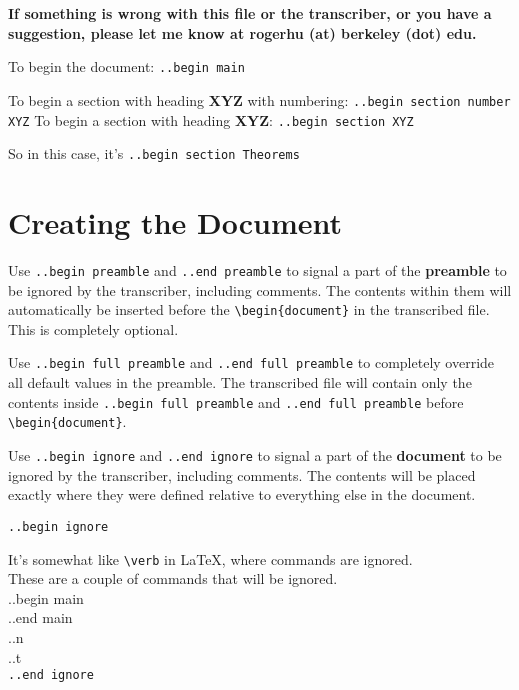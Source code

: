 \documentclass[12pt]{article}
\begin{document}
\begin{flushleft}

\textbf{If something is wrong with this file or the transcriber, or you have a suggestion, please let me know at rogerhu (at) berkeley (dot) edu.}

\bigskip

To begin the document: \verb|..begin main|

\bigskip

To begin a section with heading \textbf{XYZ} with numbering: \verb|..begin section number XYZ|
To begin a section with heading \textbf{XYZ}: \verb|..begin section XYZ|

So in this case, it's \verb|..begin section Theorems|

\section*{Creating the Document}

Use \verb|..begin preamble| and \verb|..end preamble| to signal a part of the \textbf{preamble} to be ignored by the transcriber, including comments. The contents within them will automatically be inserted before the \verb|\begin{document}| in the transcribed file. This is completely optional.

\bigskip

Use \verb|..begin full preamble| and \verb|..end full preamble| to completely override all default values in the preamble. The transcribed file will contain only the contents inside \verb|..begin full preamble| and \verb|..end full preamble| before \verb|\begin{document}|.

\bigskip

Use \verb|..begin ignore| and \verb|..end ignore| to signal a part of the \textbf{document} to be ignored by the transcriber, including comments. The contents will be placed exactly where they were defined relative to everything else in the document.

\verb|..begin ignore|

It's somewhat like \verb|\verb| in LaTeX, where commands are ignored. \\
These are a couple of commands that will be ignored. \\
..begin main \\
..end main \\
..n \\
..t \\
\verb|..end ignore|



\end{flushleft}
\end{document}
